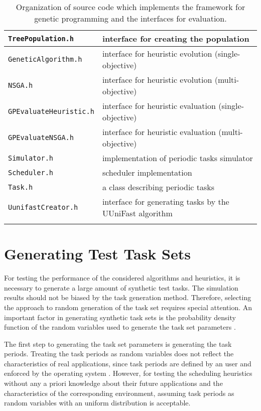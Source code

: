 \begin{longtable}{| p{} | p{} |}
\texttt{TreePopulation.h} & interface for creating the population \\ \hline
\texttt{GeneticAlgorithm.h} & interface for heuristic evolution (single-objective) \\ \hline
\texttt{NSGA.h} & interface for heuristic evolution (multi-objective) \\ \hline
\texttt{GPEvaluateHeuristic.h} & interface for heuristic evaluation (single-objective) \\ \hline
\texttt{GPEvaluateNSGA.h} & interface for heuristic evaluation (multi-objective) \\ \hline
\texttt{Simulator.h} & implementation of periodic tasks simulator \\ \hline
\texttt{Scheduler.h} & scheduler implementation \\ \hline
\texttt{Task.h} & a class describing periodic tasks \\ \hline
\texttt{UunifastCreator.h} & interface for generating tasks by the UUniFast algorithm \\ \hline
\caption{Organization of source code which implements the framework for genetic programming and the interfaces for evaluation.}
\label{code_org}
\end{longtable}

\section{Generating Test Task Sets}
For testing the performance of the considered algorithms and heuristics, it is necessary to generate a large amount of synthetic test tasks.
The simulation results should not be biased by the task generation method.
Therefore, selecting the approach to random generation of the task set requires special attention.
An important factor in generating synthetic task sets is the probability density function of the random variables used to generate the task set parameters \cite{bini2005measuring}.

The first step to generating the task set parameters is generating the task periods.
Treating the task periods as random variables does not reflect the characteristics of real applications, since task periods are defined by an user and enforced by the operating system \cite{bini2005measuring}.
However, for testing the scheduling heuristics without any a priori knowledge about their future applications and the characteristics of the corresponding environment, assuming task periods as random variables with an uniform distribution is acceptable.

